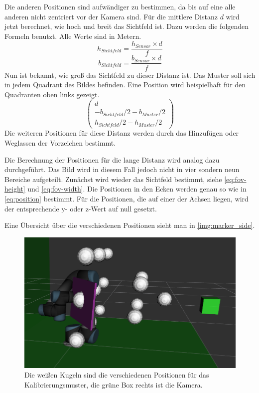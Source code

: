 Die anderen Positionen sind aufwändiger zu bestimmen, da bis auf eine alle anderen nicht zentriert vor der Kamera sind. Für die mittlere Distanz $d$ wird jetzt berechnet, wie hoch und breit das Sichtfeld ist. Dazu werden die folgenden Formeln benutzt. Alle Werte sind in Metern.
\begin{equation}\label{eq:fov-height}
	h_{Sichtfeld} = \frac{h_{Sensor} \times d}{f}
\end{equation}
\begin{equation}\label{eq:fov-width}
	b_{Sichtfeld} = \frac{b_{Sensor} \times d}{f}
\end{equation}
Nun ist bekannt, wie groß das Sichtfeld zu dieser Distanz ist. Das Muster soll sich in jedem Quadrant des Bildes befinden. Eine Position wird beispielhaft für den Quadranten oben links gezeigt.
\begin{equation}\label{eq:position}
	\begin{pmatrix}
		d\\
		-b_{Sichtfeld} / 2 - b_{Muster} / 2\\
		h_{Sichtfeld} / 2 - h_{Muster} / 2
	\end{pmatrix}
\end{equation}
Die weiteren Positionen für diese Distanz werden durch das Hinzufügen oder Weglassen der Vorzeichen bestimmt.

Die Berechnung der Positionen für die lange Distanz wird analog dazu durchgeführt. Das Bild wird in diesem Fall jedoch nicht in vier sondern neun Bereiche aufgeteilt. Zunächst wird wieder das Sichtfeld bestimmt, siehe \autoref{eq:fov-height} und \autoref{eq:fov-width}. Die Positionen in den Ecken werden genau so wie in \autoref{eq:position} bestimmt. Für die Positionen, die auf einer der Achsen liegen, wird der entsprechende y- oder z-Wert auf null gesetzt.

Eine Übersicht über die verschiedenen Positionen sieht man in \autoref{img:marker_side}.
\begin{figure}
\centering
\includegraphics[width=\textwidth]{images/marker_side.png}
\caption{Die weißen Kugeln sind die verschiedenen Positionen für das Kalibrierungsmuster, die grüne Box rechts ist die Kamera.}\label{img:marker_side}
\end{figure}


